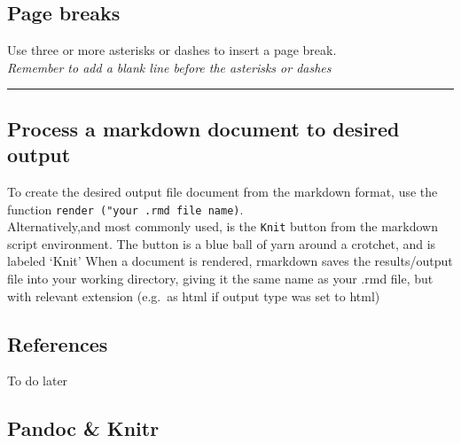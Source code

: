 \documentclass[
]{book}
\begin{document}
\hypertarget{page-breaks}{%
\subsection{Page breaks}\label{page-breaks}}

Use three or more asterisks or dashes to insert a page break.\\
\emph{Remember to add a blank line before the asterisks or dashes}

\begin{center}\rule{0.5\linewidth}{0.5pt}\end{center}

\hypertarget{process-a-markdown-document-to-desired-output}{%
\subsection{Process a markdown document to desired output}\label{process-a-markdown-document-to-desired-output}}

To create the desired output file document from the markdown format, use the function \texttt{render\ ("your\ .rmd\ file\ name)}.\\
Alternatively,and most commonly used, is the \texttt{Knit} button from the markdown script environment. The button is a blue ball of yarn around a crotchet, and is labeled `Knit'
When a document is rendered, rmarkdown saves the results/output file into your working directory, giving it the same name as your .rmd file, but with relevant extension (e.g.~as html if output type was set to html)

\hypertarget{references}{%
\subsection{References}\label{references}}

To do later

\hypertarget{pandoc-knitr}{%
\subsection{Pandoc \& Knitr}\label{pandoc-knitr}}
\end{document}

